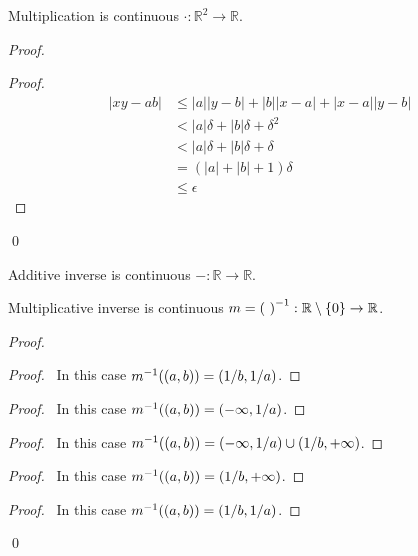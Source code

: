 \begin{prop}
  Multiplication is continuous $\cdot : \mathbb{R}^2 \rightarrow \mathbb{R}$.
\end{prop}

\begin{proof}
  \pf
  \begin{proof}
    \pf
    \begin{align*}
      |xy-ab| & \leq |a||y-b| + |b||x-a| + |x-a||y-b| \\
      & < |a| \delta + |b| \delta + \delta^2 \\
      & < |a| \delta + |b| \delta + \delta \\
      & = (|a| + |b| + 1) \delta \\
      & \leq \epsilon
    \end{align*}
  \end{proof}
  \qed
\end{proof}

\begin{cor}
  Additive inverse is continuous $- : \mathbb{R} \rightarrow \mathbb{R}$.
\end{cor}

\begin{prop}
  Multiplicative inverse is continuous $m = {(\ )}^{-1} : \mathbb{R} \setminus \{ 0 \} \rightarrow \mathbb{R}$.
\end{prop}

\begin{proof}
  \pf
  \begin{proof}
    \pf\ In this case ${m}^{-1}((a,b)) = (1/b, 1/a)$.
  \end{proof}
  \begin{proof}
    \pf\ In this case ${m}^{-1}((a,b)) = (- \infty, 1/a)$.
  \end{proof}
  \begin{proof}
    \pf\ In this case ${m}^{-1}((a,b)) = (- \infty, 1/a) \cup (1/b, + \infty)$.
  \end{proof}
  \begin{proof}
    \pf\ In this case ${m}^{-1}((a,b)) = (1/b, + \infty)$.
  \end{proof}
  \begin{proof}
    \pf\ In this case ${m}^{-1}((a,b)) = (1/b, 1/a)$.
  \end{proof}
  \qed
\end{proof}

